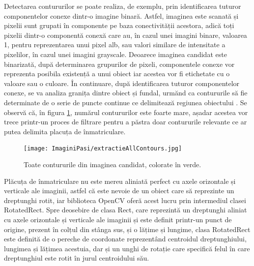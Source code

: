 \documentclass[12pt]{article}
\begin{document}
Detectarea contururilor se poate realiza, de exemplu, prin identificarea tuturor componentelor conexe dintr-o imagine binar\u{a}. Astfel, imaginea este scanat\u{a} și pixelii sunt grupati \^{i}n componente pe baza conectivit\u{a}ții acestora, adic\u{a} toți pixelii dintr-o component\u{a} conex\u{a} care au, \^{i}n cazul unei imagini binare, valoarea 1, pentru reprezentarea unui pixel alb, sau valori similare de intensitate a pixelilor, \^{i}n cazul unei imagini grayscale. Deoarece imaginea candidat este binarizat\u{a}, dup\u{a} determinarea grupurilor de pixeli, componentele conexe vor reprezenta posibila existenț\u{a} a unui obiect iar acestea vor fi etichetate cu o valoare sau o culoare. \^{I}n continuare, dup\u{a} identificarea tuturor componentelor conexe, se va analiza granița dintre obiect și fundal, urm\u{a}nd ca contururile s\u{a} fie determinate de o serie de puncte continue ce delimiteaz\u{a} regiunea obiectului \cite{connectedcomp}. Se observ\u{a} c\u{a}, \^{i}n figura \ref{fig:extractie_all_contours}, num\u{a}rul contururilor este foarte mare, așadar acestea vor trece printr-un proces de filtrare pentru a p\u{a}stra doar contururile relevante ce ar putea delimita placuța de \^{i}nmatriculare. 

\begin{figure}[H]
  \centering
  \texttt{[image: ImaginiPasi/extractieAllContours.jpg]}
  \caption{Toate contururile din imaginea candidat, colorate \^{i}n verde.}
  \label{fig:extractie_all_contours}
\end{figure}

Pl\u{a}cuța de \^{i}nmatriculare nu este mereu aliniat\u{a} perfect cu axele orizontale și verticale ale imaginii, astfel c\u{a} este nevoie de un obiect care s\u{a} reprezinte un dreptunghi rotit, iar biblioteca OpenCV ofer\u{a} acest lucru prin intermediul clasei RotatedRect. Spre deosebire de clasa Rect, care reprezint\u{a} un dreptunghi aliniat cu axele orizontale și verticale ale imaginii și este definit printr-un punct de origine, prezent \^{i}n colțul din st\^{a}nga sus, și o l\u{a}țime și lungime, clasa RotatedRect este definit\u{a} de o pereche de coordonate reprezent\^{a}nd centroidul dreptunghiului, lungimea și l\u{a}țimea acestuia, dar și un unghi de rotație care specific\u{a} felul \^{i}n care dreptunghiul este rotit \^{i}n jurul centroidului s\u{a}u.
\end{document}
